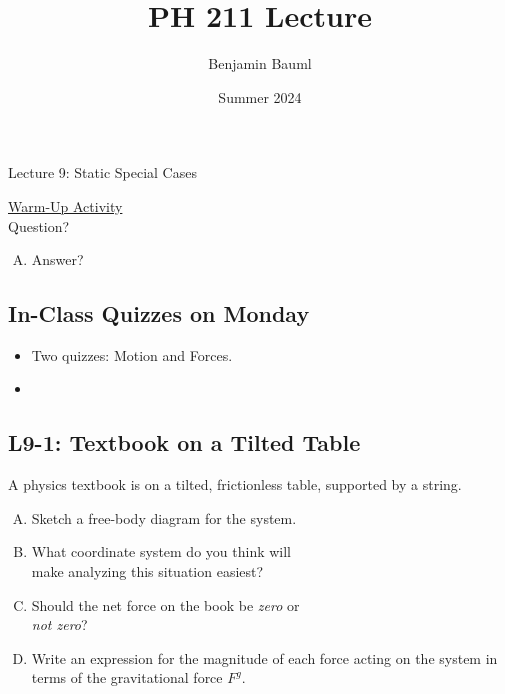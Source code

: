 \documentclass[]{article}
\title{PH 211 Lecture \Week}
\author{Benjamin Bauml}
\date{Summer 2024}
\begin{document}
\begin{TeacherMargin}

\end{TeacherMargin}
\begin{PresentSpace}
\begin{center}
	\huge Lecture 9: Static Special Cases
\end{center}
\vspace{0.5cm}
\underline{Warm-Up Activity} \\
Question?
\begin{enumerate}[(A)]
	\item Answer?
\end{enumerate}
\end{PresentSpace}
\newpage
\begin{TeacherMargin}

\end{TeacherMargin}
\begin{PresentSpace}
\vspace{-10pt}
\section*{In-Class Quizzes on Monday}
\vspace{-10pt}
\begin{itemize}
	\item Two quizzes: Motion and Forces.
	\item 
\end{itemize}
\end{PresentSpace}
\newpage
\begin{TeacherMargin}

\end{TeacherMargin}
\begin{PresentSpace}
\vspace{-10pt}
\section*{L9-1: Textbook on a Tilted Table}
\vspace{-10pt}
A physics textbook is on a tilted, frictionless table, supported by a string.
\begin{enumerate}[(A)]
	\item Sketch a free-body diagram for the system.
	\item What coordinate system do you think will \\
	make analyzing this situation easiest?
	\item Should the net force on the book be \textit{zero} or \\
	\textit{not zero}?
	\item Write an expression for the magnitude of each force acting on the system in terms of the gravitational force $F^{g}$.
\end{enumerate}
\end{PresentSpace}
\end{document}
